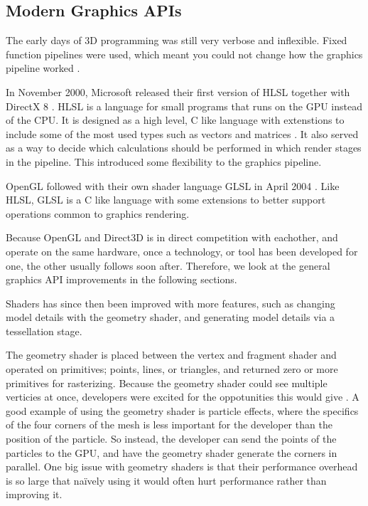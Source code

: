 \subsection{Modern Graphics \acs{API}s}

The early days of 3D programming was still very verbose and inflexible. 
Fixed function pipelines were used, which meant you could not change how the graphics pipeline worked \cite{davidovic2014fixedfunction}.

In November 2000, Microsoft released their first version of \gls{HLSL} together with DirectX 8 \cite{wikipedia????directx}.
\Gls{HLSL} is a language for small programs that runs on the \gls{GPU} instead of the \gls{CPU}.
It is designed as a high level, C like language with extenstions to include some of the most used types such as vectors and matrices \cite{microsoft????hlsl}.
It also served as a way to decide which calculations should be performed in which render stages in the pipeline.
This introduced some flexibility to the graphics pipeline.

OpenGL followed with their own shader language \gls{GLSL} in April 2004 \cite{wikipedia????opengl}.
Like \gls{HLSL}, \gls{GLSL} is a C like language with some extensions to better support operations common to graphics rendering.

\vspace{1em}

\noindent
Because OpenGL and Direct3D is in direct competition with eachother, and operate on the same hardware, once a technology, or tool has been developed for one, the other usually follows soon after.
Therefore, we look at the general graphics \gls{API} improvements in the following sections.

\vspace{1em}

\noindent
Shaders has since then been improved with more features, such as changing model details with the geometry shader, and generating model details via a tessellation stage.

The geometry shader is placed between the vertex and fragment shader and operated on primitives; points, lines, or triangles, and returned zero or more primitives for rasterizing.
Because the geometry shader could see multiple verticies at once, developers were excited for the oppotunities this would give \cite{kronos????geometry, microsoft????geometry}.
A good example of using the geometry shader is particle effects, where the specifics of the four corners of the mesh is less important for the developer than the position of the particle.
So instead, the developer can send the points of the particles to the \gls{GPU}, and have the geometry shader generate the corners in parallel.
One big issue with geometry shaders is that their performance overhead is so large that naïvely using it would often hurt performance rather than improving it.


